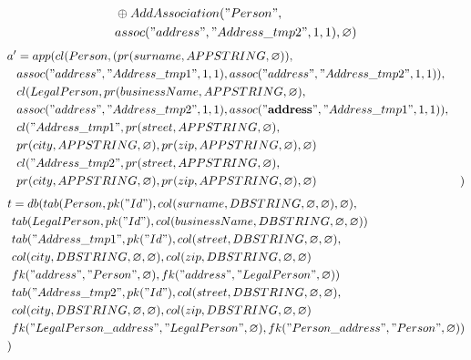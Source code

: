 \documentclass[11pt]{article}
\begin{document}
\newpage
\begin{align*}
& \oplus AddAssociation("Person", \\
& assoc("address", "Address\_tmp2", 1, 1), \varnothing) \\
\end{align*}
\hline
\begin{align*}
a' &= app(cl(Person, (pr(surname, APPSTRING, \varnothing)), \\ 
& assoc("address", "Address\_tmp1", 1, 1), assoc("address", "Address\_tmp2", 1, 1)), \\ 
& cl(LegalPerson, pr(businessName, APPSTRING, \varnothing),\\
& assoc("address", "Address\_tmp2", 1, 1), assoc(\mathbf{"address"}, "Address\_tmp1", 1, 1)), \\
& cl("Address\_tmp1", pr(street, APPSTRING, \varnothing), \\
& pr(city, APPSTRING, \varnothing), pr(zip, APPSTRING, \varnothing), \varnothing) \\
& cl("Address\_tmp2", pr(street, APPSTRING, \varnothing), \\
& pr(city, APPSTRING, \varnothing), pr(zip, APPSTRING, \varnothing), \varnothing)
& )
\end{align*}
\begin{align*}
t &= db(tab(Person, pk("Id"), col(surname, DBSTRING, \varnothing, \varnothing), \varnothing), \\
& tab(LegalPerson, pk("Id"),  col(businessName, DBSTRING, \varnothing, \varnothing)) \\
& tab("Address\_tmp1", pk("Id"), col(street, DBSTRING, \varnothing, \varnothing),\\
& col(city, DBSTRING, \varnothing, \varnothing), col(zip, DBSTRING, \varnothing, \varnothing) \\
& fk("address", "Person", \varnothing), fk("address", "LegalPerson", \varnothing))\\
& tab("Address\_tmp2", pk("Id"), col(street, DBSTRING, \varnothing, \varnothing),\\
& col(city, DBSTRING, \varnothing, \varnothing), col(zip, DBSTRING, \varnothing, \varnothing) \\
& fk("LegalPerson\_address", "LegalPerson", \varnothing), fk("Person\_address", "Person", \varnothing))\\
) 
\end{align*}
\end{document}
